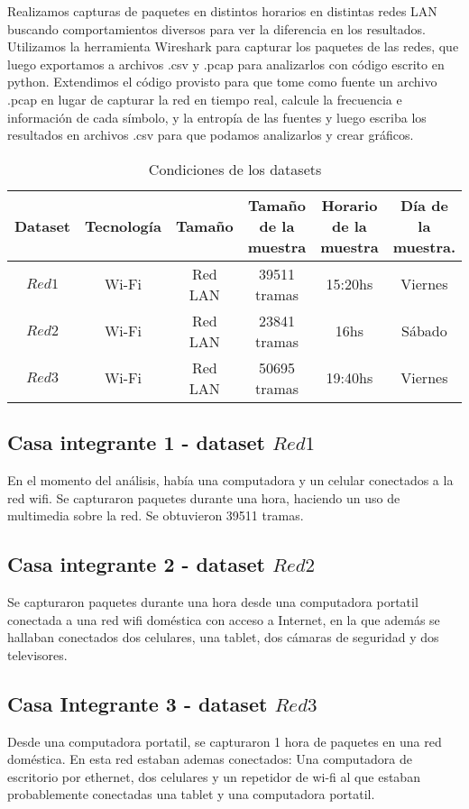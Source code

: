 Realizamos capturas de paquetes en distintos horarios en distintas redes LAN buscando comportamientos diversos para ver la diferencia en los resultados. Utilizamos la herramienta Wireshark para capturar los paquetes de las redes, que luego exportamos a archivos .csv y .pcap para analizarlos con código escrito en python. Extendimos el código provisto para que tome como fuente un archivo .pcap en lugar de capturar la red en tiempo real, calcule la frecuencia e información de cada símbolo, y la entropía de las fuentes y luego escriba los resultados en archivos .csv para que podamos analizarlos y crear gráficos.

\begin{table}[H]
    \begin{center}
        \begin{tabular}{||c c c c c c||} 
             \hline
             Dataset & Tecnología & Tamaño & Tamaño de la muestra & Horario de la muestra & Día de la muestra. \\ [0.5ex] 
             \hline\hline
             $Red 1$ & Wi-Fi & Red LAN & 39511 tramas & 15:20hs & Viernes \\ 
             \hline
             $Red 2$ & Wi-Fi & Red LAN & 23841 tramas & 16hs & Sábado \\
             \hline
             $Red 3$ & Wi-Fi & Red LAN & 50695 tramas & 19:40hs & Viernes \\ [1ex] 
             \hline
        \end{tabular}
    \end{center}
    \caption{Condiciones de los datasets}
    \label{tabla de condiciones de datasets}
\end{table}


\subsection{Casa integrante 1 - dataset $Red 1$} 
En el momento del análisis, había una computadora y un celular conectados a la red wifi. Se capturaron paquetes durante una hora, haciendo un uso de multimedia sobre la red. Se obtuvieron 39511 tramas. 

\subsection{Casa integrante 2 - dataset $Red 2$}
Se capturaron paquetes durante una hora desde una computadora portatil conectada a una red wifi doméstica con acceso a Internet, en la que además se hallaban conectados dos celulares, una tablet, dos cámaras de seguridad y dos televisores.

\subsection{Casa Integrante 3 - dataset $Red 3$}
Desde una computadora portatil, se capturaron 1 hora de paquetes en una red doméstica. En esta red estaban ademas conectados: Una computadora de escritorio por ethernet, dos celulares y un repetidor de wi-fi al que estaban probablemente conectadas una tablet y una computadora portatil.